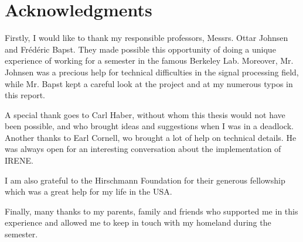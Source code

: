 
\chapter*{Acknowledgments}

Firstly, I would like to thank my responsible professors, Messrs. Ottar Johnsen and Frédéric Bapst. They made possible this opportunity of doing a unique experience of working for a semester in the famous Berkeley Lab. Moreover, Mr. Johnsen was a precious help for technical difficulties in the signal processing field, while Mr. Bapst kept a careful look at the project and at my numerous typos in this report.

A special thank goes to Carl Haber, without whom this thesis would not have been possible, and who brought ideas and suggestions when I was in a deadlock. Another thanks to Earl Cornell, wo brought a lot of help on technical details. He was always open for an interesting conversation about the implementation of IRENE.

I am also grateful to the Hirschmann Foundation for their generous fellowship which was a great help for my life in the USA.

Finally, many thanks to my parents, family and friends who supported me in this experience and allowed me to keep in touch with my homeland during the semester.

\listoffigures
\listoftables
\lstlistoflistings